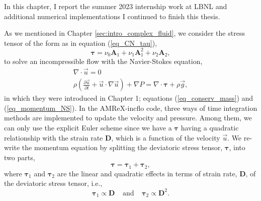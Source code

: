 \par
In this chapter, I report the summer 2023 internship work at LBNL and additional numerical implementations I continued to finish this thesis.

As we mentioned in Chapter \ref{sec:intro_complex_fluid}, we consider the stress tensor of the form as in equation (\ref{eq_CN_tau}), 
\begin{equation}
  \boldsymbol{\tau} =
  \nu_0  \bm{A}_1 +  \nu_1  \bm{A}_1^2 + \nu_2 \bm{A}_2 ,
\nonumber
\end{equation}
to solve an incompressible flow with the Navier-Stokes equation,
\begin{align}
  \nabla \cdot \vec{u} = 0 
  \nonumber \\
  \rho 
  \left( 
     \frac{\partial \vec{u}}{\partial t} + \vec{u}\cdot \nabla \vec{u}
  \right)
  + \nabla P 
    = \nabla \cdot   \bm{\tau} 
    +  \rho  \vec{g} ,
  \nonumber
  \end{align}
in which  they were introduced in Chapter 1; equations (\ref{eq_conserv_mass}) and (\ref{eq_momentum_NS}).
In the AMReX-incflo code, three ways of time integration methods are implemented to update the velocity and pressure. Among them, we can only use the explicit Euler scheme since we have a $\bm{\tau}$ having a quadratic relationship with the strain rate $\bm{D}$, which is a function of the velocity $\vec{u}$. 
We re-write the momentum equation by splitting the deviatoric stress tensor, ${\bm \tau}$, into two parts, 
\[
 {\bm \tau}= {\bm \tau_1} + {\bm \tau_2},
\] 
where ${\bm \tau_1}$ and ${\bm \tau_2}$ are the linear and quadratic effects in terms of strain rate, ${\bm D}$, of the deviatoric stress tensor, i.e., 
\[
  {\boldsymbol \tau_1} \propto \boldsymbol{D}
  \ \ \ \ \ \text{and}
   \ \ \ \ \ 
{\boldsymbol \tau_2} \propto {\boldsymbol D^2}.
\]

